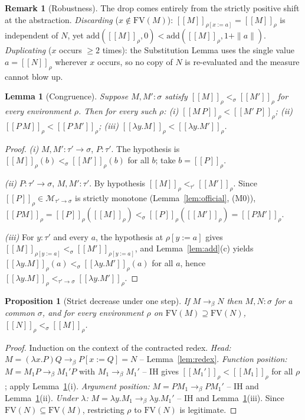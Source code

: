 \documentclass{amsart}
\newtheorem{lemma}{Lemma}
\newtheorem{proposition}{Proposition}
\theoremstyle{definition}
\newtheorem{remark}{Remark}
\newcommand{\interp}[1]{[\![#1]\!]}
\newcommand{\To}{\to_\beta}
\newcommand{\FV}{\mathrm{FV}}
\begin{document}
\begin{remark}[Robustness]
The drop comes entirely from the strictly positive shift at the abstraction.
\emph{Discarding} ($x\notin\FV(M)$): $\interp{M}_{\rho[x:=a]}=\interp{M}_\rho$ is independent
of $N$, yet $\mathrm{add}(\interp M_\rho,0)<\mathrm{add}(\interp M_\rho,1{+}\|a\|)$.
\emph{Duplicating} ($x$ occurs $\ge2$ times): the Substitution Lemma uses the single value
$a=\interp N_\rho$ wherever $x$ occurs, so no copy of $N$ is re-evaluated and the measure
cannot blow up.
\end{remark}

\begin{lemma}[Congruence]\label{lem:cong}
Suppose $M,M':\sigma$ satisfy $\interp{M}_\rho<_\sigma\interp{M'}_\rho$ for every
environment $\rho$. Then for every such $\rho$:
\textup{(i)} $\interp{M\,P}_\rho<\interp{M'\,P}_\rho$;
\textup{(ii)} $\interp{P\,M}_\rho<\interp{P\,M'}_\rho$;
\textup{(iii)} $\interp{\lambda y.M}_\rho<\interp{\lambda y.M'}_\rho$.
\end{lemma}

\begin{proof}
\emph{(i)} $M,M':\tau'\to\sigma$, $P:\tau'$. The hypothesis is
$\interp{M}_\rho(b)<_\sigma\interp{M'}_\rho(b)$ for all $b$; take $b=\interp P_\rho$.

\emph{(ii)} $P:\tau'\to\sigma$, $M,M':\tau'$. By hypothesis
$\interp{M}_\rho<_{\tau'}\interp{M'}_\rho$. Since $\interp P_\rho\in\mathcal M_{\tau'\to\sigma}$
is strictly monotone (Lemma~\ref{lem:official}, (M0)),
$\interp{PM}_\rho=\interp P_\rho(\interp M_\rho)<_\sigma\interp P_\rho(\interp{M'}_\rho)=\interp{PM'}_\rho$.

\emph{(iii)} For $y:\tau'$ and every $a$, the hypothesis at $\rho[y:=a]$ gives
$\interp{M}_{\rho[y:=a]}<_\sigma\interp{M'}_{\rho[y:=a]}$, and Lemma~\ref{lem:add}(c) yields
$\interp{\lambda y.M}_\rho(a)<_\sigma\interp{\lambda y.M'}_\rho(a)$ for all $a$, hence
$\interp{\lambda y.M}_\rho<_{\tau'\to\sigma}\interp{\lambda y.M'}_\rho$.
\end{proof}

\begin{proposition}[Strict decrease under one step]\label{prop:step}
If $M\To N$ then $M,N:\sigma$ for a common $\sigma$, and for every environment
$\rho$ on $\FV(M)\supseteq\FV(N)$, $\interp{N}_\rho<_\sigma\interp{M}_\rho$.
\end{proposition}

\begin{proof}
Induction on the context of the contracted redex.
\emph{Head:} $M=(\lambda x.P)Q\To P[x:=Q]=N$ -- Lemma~\ref{lem:redex}.
\emph{Function position:} $M=M_1P\To M_1'P$ with $M_1\To M_1'$ -- IH gives
$\interp{M_1'}_\rho<\interp{M_1}_\rho$ for all $\rho$; apply Lemma~\ref{lem:cong}(i).
\emph{Argument position:} $M=PM_1\To PM_1'$ -- IH and Lemma~\ref{lem:cong}(ii).
\emph{Under $\lambda$:} $M=\lambda y.M_1\To\lambda y.M_1'$ -- IH and
Lemma~\ref{lem:cong}(iii). Since $\FV(N)\subseteq\FV(M)$, restricting $\rho$ to $\FV(N)$ is
legitimate.
\end{proof}
\end{document}
